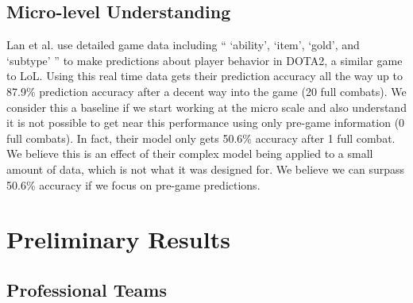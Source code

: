 \documentclass{article}
\begin{document}

\subsection{Micro-level Understanding}

Lan et al. \cite{Lan2018} use detailed game data including `` `ability', `item', `gold', and `subtype' ” to make predictions about player behavior in DOTA2, a similar game to LoL.
Using this real time data gets their prediction accuracy all the way up to 87.9\% prediction accuracy after a decent way into the game (20 full combats).
We consider this a baseline if we start working at the micro scale and also understand it is not possible to get near this performance using only pre-game information (0 full combats).
In fact, their model only gets 50.6\% accuracy after 1 full combat.
We believe this is an effect of their complex model being applied to a small amount of data, which is not what it was designed for.
We believe we can surpass 50.6\% accuracy if we focus on pre-game predictions.

\section{Preliminary Results}

\subsection{Professional Teams}
\end{document}
